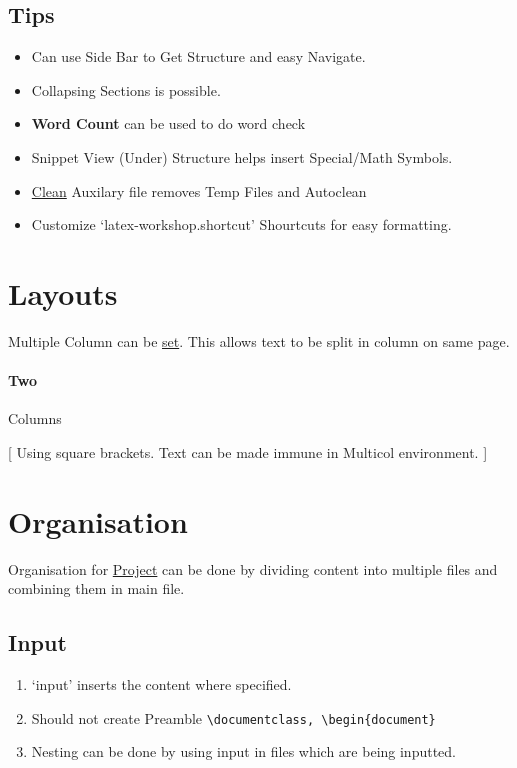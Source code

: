 \documentclass{report}[a4paper,12pt] %
\begin{document}
\subsection{Tips}
\begin{itemize}
  \item Can use Side Bar to Get Structure and easy Navigate.
  \item Collapsing Sections is possible.
  \item \textbf{Word Count} can be used to do word check
  \item Snippet View (Under) Structure helps insert Special/Math Symbols.
  \item \href{https://github.com/James-Yu/LaTeX-Workshop/wiki/Compile#cleaning-generated-files}{Clean} Auxilary file removes Temp Files and Autoclean
  \item Customize `latex-workshop.shortcut' Shourtcuts for easy formatting.
\end{itemize}

\section{Layouts}
Multiple Column can be \href{https://www.overleaf.com/learn/latex/Multiple_columns}{set}. This allows text to be split in column on same page.

\paragraph{Two} Columns
\begin{multicols}{2}
  \setlength{\columnseprule}{1pt}
  \def\columnseprulecolor{\color{blue}}

  [
  Using square brackets. Text can be made immune in Multicol environment.
  ]
  \lipsum[2]
\end{multicols}

\section{Organisation}
Organisation for \href{https://www.overleaf.com/learn/latex/Management_in_a_large_project}{Project} can be done by dividing content into multiple files
and combining them in main file.

\subsection{Input}
\begin{enumerate}
  \item `input' inserts the content where specified.
  \item Should not create Preamble \verb|\documentclass, \begin{document}|
  \item Nesting can be done by using input in files which are being inputted.
\end{enumerate}
\end{document}
